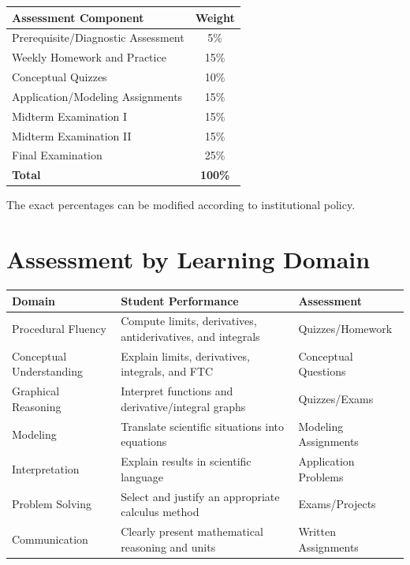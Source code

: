 \documentclass[11pt]{article}
\begin{document}
\begin{center}
\begin{tabular}{lc}
\toprule
\textbf{Assessment Component} & \textbf{Weight} \\
\midrule
Prerequisite/Diagnostic Assessment & 5\% \\
Weekly Homework and Practice & 15\% \\
Conceptual Quizzes & 10\% \\
Application/Modeling Assignments & 15\% \\
Midterm Examination I & 15\% \\
Midterm Examination II & 15\% \\
Final Examination & 25\% \\
\midrule
\textbf{Total} & \textbf{100\%} \\
\bottomrule
\end{tabular}
\end{center}

The exact percentages can be modified according to institutional policy.

\section{Assessment by Learning Domain}

\begin{longtable}{p{4cm}p{7cm}p{3cm}}
\toprule
\textbf{Domain} & \textbf{Student Performance}
& \textbf{Assessment} \\
\midrule

Procedural Fluency
& Compute limits, derivatives, antiderivatives, and integrals
& Quizzes/Homework \\

Conceptual Understanding
& Explain limits, derivatives, integrals, and FTC
& Conceptual Questions \\

Graphical Reasoning
& Interpret functions and derivative/integral graphs
& Quizzes/Exams \\

Modeling
& Translate scientific situations into equations
& Modeling Assignments \\

Interpretation
& Explain results in scientific language
& Application Problems \\

Problem Solving
& Select and justify an appropriate calculus method
& Exams/Projects \\

Communication
& Clearly present mathematical reasoning and units
& Written Assignments \\

\bottomrule
\end{longtable}
\end{document}
